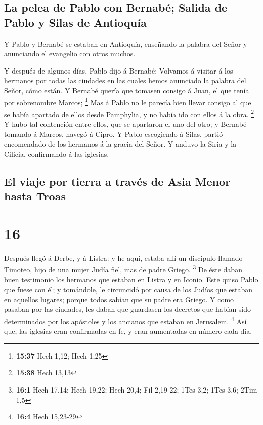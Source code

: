 \hypertarget{la-pelea-de-pablo-con-bernabuxe9-salida-de-pablo-y-silas-de-antioquuxeda}{%
\subsection{La pelea de Pablo con Bernabé; Salida de Pablo y Silas de
Antioquía}\label{la-pelea-de-pablo-con-bernabuxe9-salida-de-pablo-y-silas-de-antioquuxeda}}

 Y Pablo y Bernabé se estaban en Antioquía, enseñando la
palabra del Señor y anunciando el evangelio con otros muchos.

 Y después de algunos días, Pablo dijo á Bernabé: Volvamos
á visitar á los hermanos por todas las ciudades en las cuales hemos
anunciado la palabra del Señor, cómo están.  Y Bernabé
quería que tomasen consigo á Juan, el que tenía por sobrenombre Marcos;
\footnote{\textbf{15:37} Hech 1,12; Hech 1,25}  Mas á Pablo
no le parecía bien llevar consigo al que se había apartado de ellos
desde Pamphylia, y no había ido con ellos á la obra. \footnote{\textbf{15:38}
  Hech 13,13}  Y hubo tal contención entre ellos, que se
apartaron el uno del otro; y Bernabé tomando á Marcos, navegó á Cipro.
 Y Pablo escogiendo á Silas, partió encomendado de los
hermanos á la gracia del Señor.  Y anduvo la Siria y la
Cilicia, confirmando á las iglesias.

\hypertarget{el-viaje-por-tierra-a-travuxe9s-de-asia-menor-hasta-troas}{%
\subsection{El viaje por tierra a través de Asia Menor hasta
Troas}\label{el-viaje-por-tierra-a-travuxe9s-de-asia-menor-hasta-troas}}

\hypertarget{section-15}{%
\section{16}\label{section-15}}

 Después llegó á Derbe, y á Listra: y he aquí, estaba allí
un discípulo llamado Timoteo, hijo de una mujer Judía fiel, mas de padre
Griego. \footnote{\textbf{16:1} Hech 17,14; Hech 19,22; Hech 20,4; Fil
  2,19-22; 1Tes 3,2; 1Tes 3,6; 2Tim 1,5}  De éste daban buen
testimonio los hermanos que estaban en Listra y en Iconio. 
Este quiso Pablo que fuese con él; y tomándole, le circuncidó por causa
de los Judíos que estaban en aquellos lugares; porque todos sabían que
su padre era Griego.  Y como pasaban por las ciudades, les
daban que guardasen los decretos que habían sido determinados por los
apóstoles y los ancianos que estaban en Jerusalem. \footnote{\textbf{16:4}
  Hech 15,23-29}  Así que, las iglesias eran confirmadas en
fe, y eran aumentadas en número cada día.

